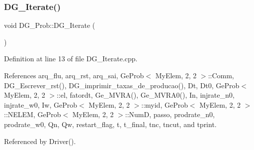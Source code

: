 \subsubsection{\texorpdfstring{D\+G\+\_\+\+Iterate()}{DG\_Iterate()}}
{\footnotesize\ttfamily void D\+G\+\_\+\+Prob\+::\+D\+G\+\_\+\+Iterate (\begin{DoxyParamCaption}{ }\end{DoxyParamCaption})}



Definition at line 13 of file D\+G\+\_\+\+Iterate.\+cpp.



References arq\+\_\+flu, arq\+\_\+rst, arq\+\_\+sai, Ge\+Prob$<$ My\+Elem, 2, 2 $>$\+::\+Comm, D\+G\+\_\+\+Escrever\+\_\+rst(), D\+G\+\_\+imprimir\+\_\+taxas\+\_\+de\+\_\+producao(), Dt, Dt0, Ge\+Prob$<$ My\+Elem, 2, 2 $>$\+::el, fatordt, Ge\+\_\+\+M\+V\+R\+A(), Ge\+\_\+\+M\+V\+R\+A0(), In, injrate\+\_\+n0, injrate\+\_\+w0, Iw, Ge\+Prob$<$ My\+Elem, 2, 2 $>$\+::myid, Ge\+Prob$<$ My\+Elem, 2, 2 $>$\+::\+N\+E\+L\+EM, Ge\+Prob$<$ My\+Elem, 2, 2 $>$\+::\+NumD, passo, prodrate\+\_\+n0, prodrate\+\_\+w0, Qn, Qw, restart\+\_\+flag, t, t\+\_\+final, tnc, tncut, and tprint.



Referenced by Driver().

